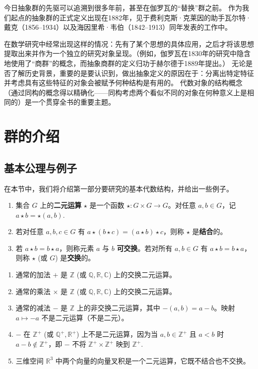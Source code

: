 今日抽象群的先驱可以追溯到很多年前，甚至在伽罗瓦的“替换”群之前。
作为我们起点的抽象群的正式定义出现在1882年，见于费利克斯·克莱因的助手瓦尔特·戴克（1856–1934）以及海因里希·韦伯（1842–1913）同年发表的工作中。

在数学研究中经常出现这样的情况：先有了某个思想的具体应用，之后才将该思想提取出来并作为一个独立的研究对象呈现。（例如，伽罗瓦在1830年的研究中隐含地使用了“商群”的概念，而抽象商群的定义归功于赫尔德于1889年提出。）
无论是否了解历史背景，重要的是要认识到，做出抽象定义的原因在于：分离出特定特征并考虑具有这些特征的对象会被赋予何种结构是有用的。
代数对象的结构概念（通过同构的概念得以精确化——同构考虑两个看似不同的对象在何种意义上是相同的）是一个贯穿全书的重要主题。

\setcounter{chapter}{0}


\chapter{群的介绍}

\section{基本公理与例子}

在本节中，我们将介绍第一部分要研究的基本代数结构，并给出一些例子。
    
\begin{definition}
\begin{enumerate}[label=(\arabic*)]
\item 集合 \(G\) 上的\textbf{二元运算} \(\star\) 是一个函数 \(\star : G \times G \to G\)。对任意 \(a, b \in G\)，记 \(a \star b = \star(a, b)\).
\item 若对任意 \(a, b, c \in G\) 有 \(a \star (b \star c) = (a \star b) \star c\)，则称 \(\star\) 是\textbf{结合}的。
\item 若 \(a \star b = b \star a\)，则称元素 \(a\) 与 \(b\) \textbf{可交换}。若对所有 \(a, b \in G\) 有 \(a \star b = b \star a\)，则称 \(\star\) (或 \(G\)) 是\textbf{交换}的。
\end{enumerate}
\end{definition}

\begin{example}
\begin{enumerate}[label=(\arabic*)]
\item 通常的加法 \(+\) 是 \(\mathbb{Z}\) (或 \(\mathbb{Q}, \mathbb{R}, \mathbb{C}\)) 上的交换二元运算。
\item 通常的乘法 \(\times\) 是 \(\mathbb{Z}\) (或 \(\mathbb{Q}, \mathbb{R}, \mathbb{C}\)) 上的交换二元运算。
\item 通常的减法 \(-\) 是 \(\mathbb{Z}\) 上的非交换二元运算，其中 \(-(a, b) = a - b\)。映射 \(a \mapsto -a\) 不是二元运算（不是二元）。
\item \(-\) 在 \(\mathbb{Z}^+\) (或 \(\mathbb{Q}^+, \mathbb{R}^+\)) 上不是二元运算，因为当 \(a, b \in \mathbb{Z}^+\) 且 \(a < b\) 时 \(a - b \notin \mathbb{Z}^+\)，即 \(-\) 不将 \(\mathbb{Z}^+ \times \mathbb{Z}^+\) 映到 \(\mathbb{Z}^+\).
\item 三维空间 \(\mathbb{R}^3\) 中两个向量的向量叉积是一个二元运算，它既不结合也不交换。
\end{enumerate}
\end{example}

